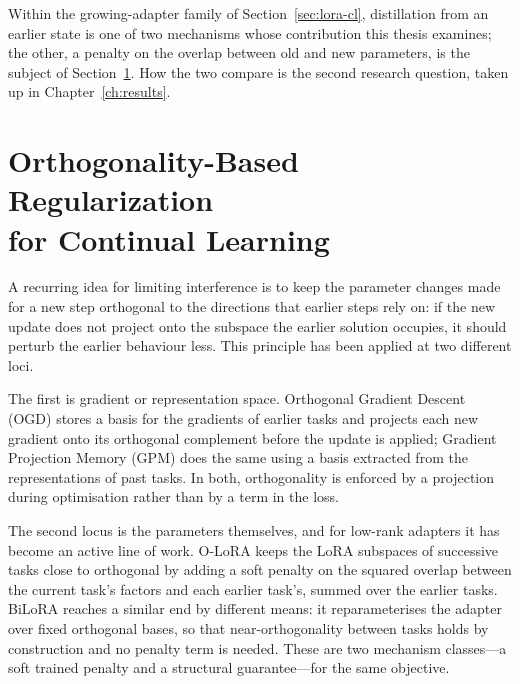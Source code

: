 Within the growing-adapter family of Section~\ref{sec:lora-cl}, distillation from an
earlier state is one of two mechanisms whose contribution this thesis
examines; the other, a penalty on the overlap between old and new
parameters, is the subject of Section~\ref{sec:orthogonality}. How the two compare is the
second research question, taken up in Chapter~\ref{ch:results}.

\section[Orthogonality-Based Regularization for Continual Learning]{Orthogonality-Based Regularization\\for Continual Learning}
\label{sec:orthogonality}

A recurring idea for limiting interference is to keep the parameter changes
made for a new step orthogonal to the directions that earlier steps rely
on: if the new update does not project onto the subspace the earlier
solution occupies, it should perturb the earlier behaviour less. This
principle has been applied at two different loci.

The first is gradient or representation space. Orthogonal Gradient Descent
(OGD) \parencite{farajtabar2020orthogonal} stores a basis for the gradients of earlier
tasks and projects each new gradient onto its orthogonal complement before
the update is applied; Gradient Projection Memory (GPM) \parencite{saha2021gradient}
does the same using a basis extracted from the representations of past
tasks. In
both, orthogonality is enforced by a projection during optimisation rather
than by a term in the loss.

The second locus is the parameters themselves, and for low-rank adapters it
has become an active line of work. O-LoRA \parencite{wang2023orthogonal} keeps the
LoRA subspaces of successive tasks close to orthogonal by adding a soft
penalty on the squared overlap between the current task's factors and each
earlier task's, summed over the earlier tasks. BiLoRA \parencite{zhu2025bilora}
reaches a similar end by different means: it reparameterises the adapter
over fixed orthogonal bases, so that near-orthogonality between tasks holds
by construction and no penalty term is needed. These are two mechanism
classes---a soft trained penalty and a structural guarantee---for the same
objective.

